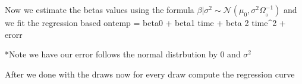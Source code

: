 \documentclass[
]{article}
\newenvironment{Shaded}{\begin{snugshade}}{\end{snugshade}}
\newcommand{\ControlFlowTok}[1]{\textcolor[rgb]{0.13,0.29,0.53}{\textbf{#1}}}
\newcommand{\DecValTok}[1]{\textcolor[rgb]{0.00,0.00,0.81}{#1}}
\newcommand{\FunctionTok}[1]{\textcolor[rgb]{0.00,0.00,0.00}{#1}}
\newcommand{\NormalTok}[1]{#1}
\newcommand{\OtherTok}[1]{\textcolor[rgb]{0.56,0.35,0.01}{#1}}
\newcommand{\SpecialCharTok}[1]{\textcolor[rgb]{0.00,0.00,0.00}{#1}}
\newcommand{\StringTok}[1]{\textcolor[rgb]{0.31,0.60,0.02}{#1}}
\begin{document}
Now we estimate the betas values using the formula
\(\beta|\sigma^2\sim\mathcal{N}(\mu_0,\sigma^2\Omega_{_0}^{-1})\) and we
fit the regression based ontemp = beta0 + beta1 time + beta 2 time\^{}2
+ erorr

*Note we have our error follows the normal distrbution by 0 and
\(\sigma^2\)

\begin{Shaded}
\end{Shaded}

After we done with the draws now for every draw compute the regression
curve
\end{document}
